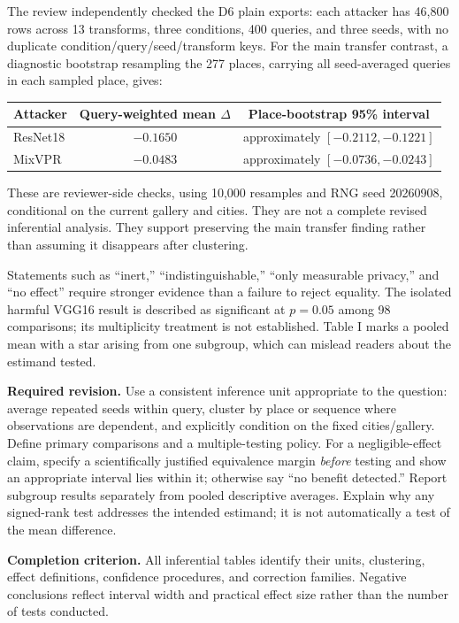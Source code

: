 \documentclass[11pt,a4paper]{article}
\newcommand{\action}{\par\textbf{Required revision.} }
\newcommand{\acceptance}{\par\textbf{Completion criterion.} }
\begin{document}
The review independently checked the D6 plain exports: each attacker has 46,800 rows across 13 transforms, three conditions, 400 queries, and three seeds, with no duplicate condition/query/seed/transform keys. For the main transfer contrast, a diagnostic bootstrap resampling the 277 places, carrying all seed-averaged queries in each sampled place, gives:
\begin{center}
\begin{tabular}{lcc}
\toprule
Attacker & Query-weighted mean $\Delta$ & Place-bootstrap 95\% interval \\
\midrule
ResNet18 & $-0.1650$ & approximately $[-0.2112,-0.1221]$ \\
MixVPR & $-0.0483$ & approximately $[-0.0736,-0.0243]$ \\
\bottomrule
\end{tabular}
\end{center}
These are reviewer-side checks, using 10,000 resamples and RNG seed 20260908, conditional on the current gallery and cities. They are not a complete revised inferential analysis. They support preserving the main transfer finding rather than assuming it disappears after clustering.

Statements such as ``inert,'' ``indistinguishable,'' ``only measurable privacy,'' and ``no effect'' require stronger evidence than a failure to reject equality. The isolated harmful VGG16 result is described as significant at $p=0.05$ among 98 comparisons; its multiplicity treatment is not established. Table I marks a pooled mean with a star arising from one subgroup, which can mislead readers about the estimand tested.

\action
Use a consistent inference unit appropriate to the question: average repeated seeds within query, cluster by place or sequence where observations are dependent, and explicitly condition on the fixed cities/gallery. Define primary comparisons and a multiple-testing policy. For a negligible-effect claim, specify a scientifically justified equivalence margin \emph{before} testing and show an appropriate interval lies within it; otherwise say ``no benefit detected.'' Report subgroup results separately from pooled descriptive averages. Explain why any signed-rank test addresses the intended estimand; it is not automatically a test of the mean difference.
\acceptance
All inferential tables identify their units, clustering, effect definitions, confidence procedures, and correction families. Negative conclusions reflect interval width and practical effect size rather than the number of tests conducted.
\end{document}

